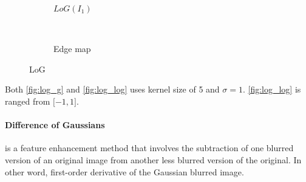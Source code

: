 \documentclass[12pt]{article}
\begin{document}
\begin{figure}[H]
\begin{subfigure}[t]{0.5\textwidth}
        \caption{$LoG(I_1)$}
        \label{fig:log_log}
    \end{subfigure}%
    ~
    \begin{subfigure}[t]{0.5\textwidth}
        \centering
        \caption{Edge map}
    \end{subfigure}
    \caption{LoG}
\end{figure}
Both \autoref{fig:log_g} and \autoref{fig:log_log} uses kernel size of 5 and $\sigma=1$. \autoref{fig:log_log} is ranged from $\lbrack -1, 1 \rbrack$. 

\paragraph*{Difference of Gaussians} is a feature enhancement method that involves the subtraction of one blurred version of an original image from another less blurred version of the original. 
In other word, first-order derivative of the Gaussian blurred image.
\end{document}
